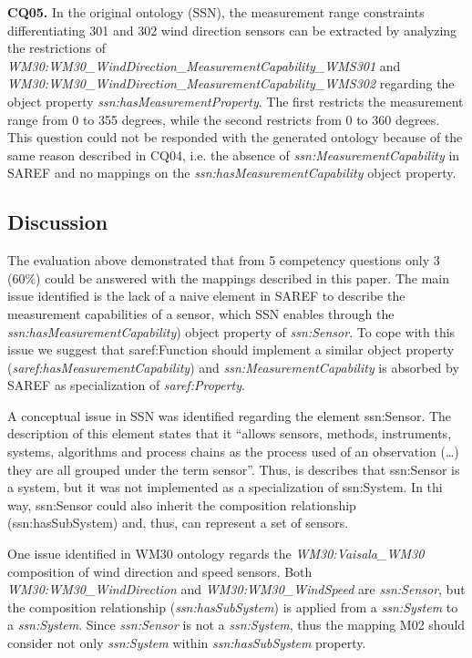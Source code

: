 \documentclass{sig-alternate-05-2015}
\begin{document}
\textbf{CQ05.} In the original ontology (SSN), the measurement range constraints differentiating 301 and 302 wind direction sensors can be extracted by analyzing the restrictions of \textit{WM30:WM30\_WindDirection\_MeasurementCapability\_WMS301} and \textit{WM30:WM30\_WindDirection\_MeasurementCapability\_WMS302} regarding the object property \textit{ssn:hasMeasurementProperty}. The first restricts the measurement range from 0 to 355 degrees, while the second restricts from 0 to 360 degrees. This question could not be responded with the generated ontology because of the same reason described in CQ04, i.e. the absence of \textit{ssn:MeasurementCapability} in SAREF and no mappings on the \textit{ssn:hasMeasurementCapability} object property.


\subsection{Discussion}

The evaluation above demonstrated that from 5 competency questions only 3 (60\%) could be answered with the mappings described in this paper. The main issue identified is the lack of a naive element in SAREF to describe the measurement capabilities  of a sensor, which SSN enables through the \textit{ssn:hasMeasurementCapability}) object property of \textit{ssn:Sensor}. To cope with this issue we suggest that saref:Function should implement a similar object property (\textit{saref:hasMeasurementCapability}) and \textit{ssn:MeasurementCapability} is absorbed by SAREF as specialization of \textit{saref:Property}. 

A conceptual issue in SSN was identified regarding the element ssn:Sensor. The description of this element states that it “allows sensors, methods, instruments, systems, algorithms and process chains as the process used of an observation (…) they are all grouped under the term sensor”. Thus, is describes that ssn:Sensor is a system, but it was not implemented as a specialization of ssn:System. In thi way, ssn:Sensor could also inherit the composition relationship (ssn:hasSubSystem) and, thus, can represent a set of sensors. 

One issue identified in WM30 ontology regards the \textit{WM30:Vaisala\_WM30} composition of wind direction and speed sensors. Both \textit{WM30:WM30\_WindDirection} and \textit{WM30:WM30\_WindSpeed} are \textit{ssn:Sensor}, but the composition relationship (\textit{ssn:hasSubSystem}) is applied from a \textit{ssn:System} to a \textit{ssn:System}. Since \textit{ssn:Sensor} is not a \textit{ssn:System}, thus the mapping M02 should consider not only \textit{ssn:System} within \textit{ssn:hasSubSystem} property. 
\end{document}
